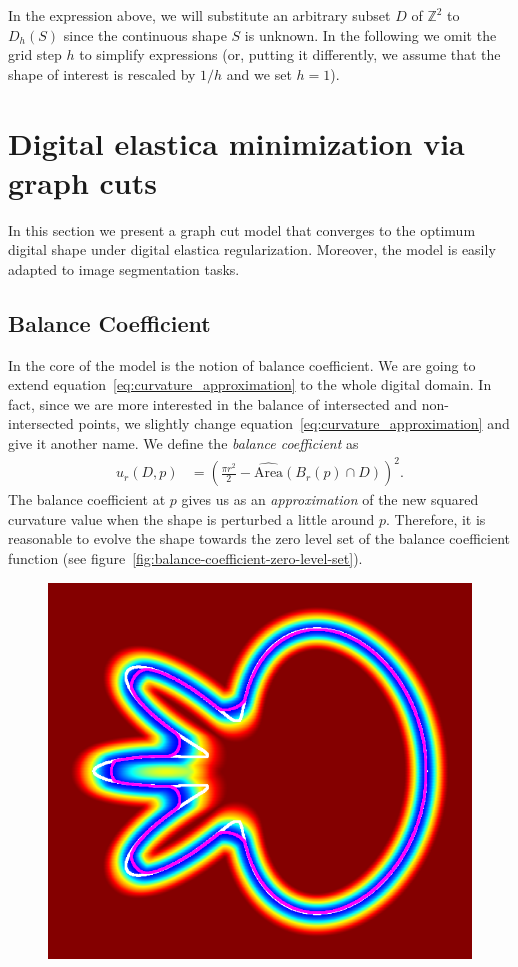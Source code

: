\documentclass[runningheads]{llncs}
\newcommand{\daniel}[1]{ {\color{black}#1} }
\newcommand{\Ds}{D}
\begin{document}
In the expression above, we will substitute an arbitrary
subset $\Ds$ of $\mathbb{Z}^2$ to $D_h(S)$ since the continuous shape $S$ is unknown.  In the following we omit
the grid step $h$ to simplify expressions (or, putting it differently, we assume that the shape of interest is
rescaled by $1/h$ and we set $h=1$).


\section{Digital elastica minimization via graph cuts}
In this section we present a graph cut model that converges to the optimum digital shape under digital elastica
regularization. Moreover, the model is easily adapted to image segmentation tasks. 

\daniel{\subsection{Balance Coefficient}
In the core of the model is the notion of balance coefficient. We are going to extend equation~\ref{eq:curvature_approximation} to the whole digital domain. In fact, since we are more interested in the  balance of intersected and non-intersected points, we slightly change equation~\ref{eq:curvature_approximation} and give it another name. We define the \emph{balance coefficient} as
%
\begin{align*}
  u_r(D,p) &= \left( \frac{\pi r^2}{2} - \widehat{\text{Area}}(B_r(p) \cap D) \right)^2.
\end{align*}
%
 The balance coefficient at $p$ gives us as an \emph{approximation} of the new squared curvature value when the shape is perturbed a little around $p$. Therefore, it is reasonable to evolve the shape towards the zero level set of the balance coefficient function (see figure~\ref{fig:balance-coefficient-zero-level-set}).
\begin{figure}
 \center
 \includegraphics[scale=0.32]{figures/zero-level-set/balance-coefficient-zero-level-set.png}

\end{figure}}
\end{document}
